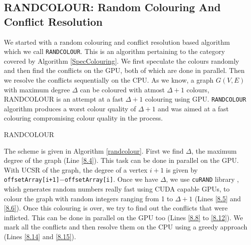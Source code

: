 \documentclass[MTech]{iitmdiss}
\makeatletter
\def\BState{\State\hskip-\ALG@thistlm}
\makeatother
\begin{document}
\subsection{RANDCOLOUR: Random Colouring And Conflict Resolution}
We started with a random colouring and conflict resolution based algorithm which we call \verb+RANDCOLOUR+. This is an algorithm pertaining to the category covered by Algorithm \ref{SpecColouring}. We first speculate the colours randomly and then find the conflicts on the GPU, both of which are done in parallel. Then we resolve the conflicts sequentially on the CPU. As we know, a graph $G(V,E)$ with maximum degree $\Delta$ can be coloured with atmost $\Delta+1$ colours, RANDCOLOUR is an attempt at a fast $\Delta+1$ colouring using GPU. \verb+RANDCOLOUR+ algorithm produces a worst colour quality of $\Delta+1$ and was aimed at a fast colouring compromising colour quality in the process.

\begin{algorithm}
\caption{RANDCOLOUR}\label{randcolour}
\end{algorithm}

The scheme is given in Algorithm \ref{randcolour}. First we find $\Delta$, the maximum degree of the graph (Line \ref{8.4}). This task can be done in parallel on the GPU. With UCSR of the graph, the degree of a vertex $i+1$ is given by \verb|offsetArray[i+1]|$-$\verb+offsetArray[i]+. Once we have $\Delta$, we use \verb+cuRAND+ library \citep{nVidia:cuRAND}, which generates random numbers really fast using CUDA capable GPUs, to colour the graph with random integers ranging from 1 to $\Delta+1$ (Lines \ref{8.5} and \ref{8.6}). Once this colouring is over, we try to find out the conflicts that were inflicted. This can be done in parallel on the GPU too (Lines \ref{8.8} to \ref{8.12}). We mark all the conflicts and then resolve them on the CPU using a greedy approach (Lines \ref{8.14} and \ref{8.15}).
\end{document}
